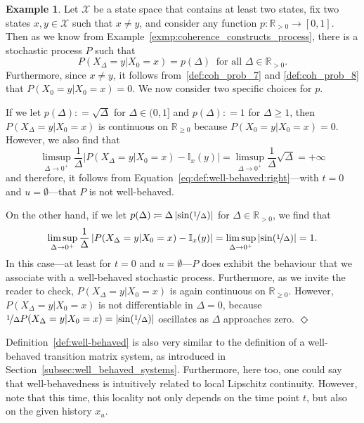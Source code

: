 \documentclass[10pt,a4paper]{paper}
\theoremstyle{definition}
\newtheorem{exmp}{Example}
\newcommand{\reals}{\mathbb{R}}
\newcommand{\realspos}{\reals_{>0}}
\newcommand{\states}{\mathcal{X}}
\newcommand{\ind}[1]{\mathbb{I}_{#1}}
\newcommand{\abs}[1]{\left\vert #1 \right\vert}
\newcommand{\coloneqq}{:\!=}
\newcommand{\exampleend}{\hfill$\Diamond$}
\begin{document}
\begin{exmp}\label{exmp:well-behaved}
Let $\states$ be a state space that contains at least two states, fix two states $x,y\in\states$ such that $x\neq y$, and consider any function $p:\reals_{>0}\to[0,1]$. Then as we know from Example~\ref{exmp:coherence_constructs_process}, there is a stochastic process $P$ such that
\begin{equation*}
P(X_\Delta=y\vert X_0=x)=p(\Delta)
~\text{ for all $\Delta\in\realspos$.}
\end{equation*}
Furthermore, since $x\neq y$, it follows from~\ref{def:coh_prob_7} and \ref{def:coh_prob_8} that $P(X_0=y\vert X_0=x)=0$. We now consider two specific choices for $p$.

If we let $p(\Delta)\coloneqq\sqrt\Delta$ for $\Delta\in(0,1]$ and $p(\Delta)\coloneqq 1$ for $\Delta\geq1$, then $P(X_\Delta=y\vert X_0=x)$ is continuous on $\reals_{\geq0}$ because $P(X_0=y\vert X_0=x)=0$. However, we also find that
\begin{equation*}
\limsup_{\Delta\to0^+}\frac{1}{\Delta}\abs{P(X_{\Delta}=y\vert X_{0}=x) - \ind{x}(y)}
=
\limsup_{\Delta\to0^+}\frac{1}{\Delta}\sqrt\Delta
=+\infty
\end{equation*}
and therefore, it follows from Equation~\eqref{eq:def:well-behaved:right}---with $t=0$ and $u=\emptyset$---that $P$ is not well-behaved.

On the other hand, if we let $p(\Delta)\coloneqq \Delta\abs{\sin(\nicefrac{1}{\Delta})}$ for $\Delta\in\realspos$, we find that
\begin{equation*}
\limsup_{\Delta\to0^+}\frac{1}{\Delta}\abs{P(X_{\Delta}=y\vert X_{0}=x) - \ind{x}(y)}
=
\limsup_{\Delta\to0^+}\abs{\sin(\nicefrac{1}{\Delta})}
=1.
\end{equation*}
In this case---at least for $t=0$ and $u=\emptyset$---$P$ does exhibit the behaviour that we associate with a well-behaved stochastic process. Furthermore, as we invite the reader to check, $P(X_\Delta=y\vert X_0=x)$ is again continuous on $\reals_{\geq0}$. However, $P(X_\Delta=y\vert X_0=x)$ is not differentiable in $\Delta=0$, because $\nicefrac{1}{\Delta}P(X_\Delta=y\vert X_0=x)=\abs{\sin(\nicefrac{1}{\Delta})}$ oscillates as $\Delta$ approaches zero.
\exampleend
\end{exmp}

Definition~\ref{def:well-behaved} is also very similar to the definition of a well-behaved transition matrix system, as introduced in Section~\ref{subsec:well_behaved_systems}. Furthermore, here too, one could say that well-behavedness is intuitively related to local Lipschitz continuity. However, note that this time, this locality not only depends on the time point $t$, but also on the given history $x_u$.
\end{document}
